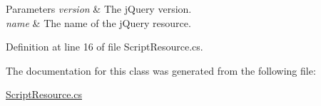 \begin{DoxyParams}{Parameters}
{\em version} & The {\ttfamily j\+Query} version.\\
\hline
{\em name} & The name of the {\ttfamily j\+Query} resource.\\
\hline
\end{DoxyParams}


Definition at line 16 of file Script\+Resource.\+cs.



The documentation for this class was generated from the following file\+:\begin{DoxyCompactItemize}
\item 
\mbox{\hyperlink{ScriptResource_8cs}{Script\+Resource.\+cs}}\end{DoxyCompactItemize}
